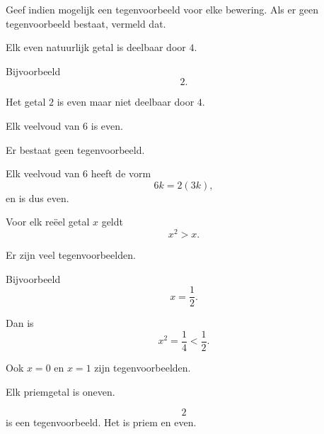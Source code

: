 \documentclass{ximera}
\begin{document}
\begin{oefening}{\oefU \ESS}

Geef indien mogelijk een tegenvoorbeeld voor elke bewering.
Als er geen tegenvoorbeeld bestaat, vermeld dat.

\begin{question}
Elk even natuurlijk getal is deelbaar door $4$.

\begin{oplossing}
Bijvoorbeeld
\[
2.
\]

Het getal $2$ is even maar niet deelbaar door $4$.
\end{oplossing}
\end{question}


\begin{question}
Elk veelvoud van $6$ is even.

\begin{oplossing}
Er bestaat geen tegenvoorbeeld.

Elk veelvoud van $6$ heeft de vorm
\[
6k=2(3k),
\]
en is dus even.
\end{oplossing}
\end{question}


\begin{question}
Voor elk reëel getal $x$ geldt
\[
x^2>x.
\]

\begin{oplossing}
Er zijn veel tegenvoorbeelden.

Bijvoorbeeld
\[
x=\frac12.
\]

Dan is
\[
x^2=\frac14<\frac12.
\]

Ook $x=0$ en $x=1$ zijn tegenvoorbeelden.
\end{oplossing}
\end{question}


\begin{question}
Elk priemgetal is oneven.

\begin{oplossing}
\[
2
\]
is een tegenvoorbeeld. Het is priem en even.
\end{oplossing}
\end{question}

\end{oefening}
\end{document}
